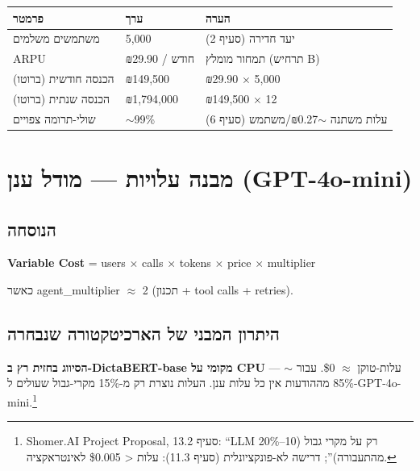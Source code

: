 \documentclass[11pt]{article}
\newcommand{\en}[1]{\textenglish{#1}}
\begin{document}
\begin{longtable}{|>{\raggedright\arraybackslash}p{5.0cm}|>{\raggedright\arraybackslash}p{3.5cm}|>{\raggedright\arraybackslash}p{5.0cm}|}
\hline
\rowcolor{hdr}
\textbf{פרמטר} & \textbf{ערך} & \textbf{הערה} \\
\hline
\endhead
משתמשים משלמים & \en{5,000} & יעד חדירה (סעיף 2) \\ \hline
\rowcolor{ltgray}
\en{ARPU} & ₪\en{29.90} / חודש & תמחור מומלץ (תרחיש \en{B}) \\ \hline
הכנסה חודשית (ברוטו) & ₪\en{149,500} & ₪\en{29.90} $\times$ \en{5,000} \\ \hline
\rowcolor{ltgray}
הכנסה שנתית (ברוטו) & ₪\en{1,794,000} & ₪\en{149,500} $\times$ \en{12} \\ \hline
שולי-תרומה צפויים & $\sim$\en{99\%} & עלות משתנה $\sim$₪\en{0.27}/משתמש (סעיף 6) \\ \hline
\end{longtable}

\section{מבנה עלויות — מודל ענן (\en{GPT-4o-mini})}

\subsection*{הנוסחה}
\begin{center}
\textenglish{\textbf{Variable Cost} = users $\times$ calls $\times$ tokens $\times$ price $\times$ multiplier}
\end{center}
כאשר \en{agent\_multiplier} $\approx$ \en{2} (תכנון + \en{tool calls} + \en{retries}).

\subsection*{היתרון המבני של הארכיטקטורה שנבחרה}

\textbf{הסיווג בחזית רץ ב-\en{DictaBERT-base} מקומי על \en{CPU}} — עלות-טוקן $\approx$ \en{\$0}. עבור $\sim$\en{85\%} מההודעות אין כל עלות ענן. העלות נוצרת רק מ-\en{15\%} מקרי-גבול שעולים ל-\en{GPT-4o-mini}.\footnote{\en{Shomer.AI Project Proposal}, סעיף \en{13.2}: ``\en{LLM} רק על מקרי גבול (\en{10--20\%} מהתעבורה)''; דרישה לא-פונקציונלית (סעיף \en{11.3}): עלות \en{< \$0.005} לאינטראקציה.}
\end{document}
